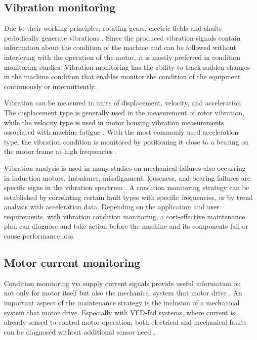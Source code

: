 \subsection{Vibration monitoring}

Due to their working principles, rotating gears, electric fields and shafts periodically generate vibrations \cite{randall2021vibration}. Since the produced vibration signals contain information about the condition of the machine and can be followed without interfering with the operation of the motor, it is mostly preferred in condition monitoring studies. Vibration monitoring has the ability to track sudden changes in the machine condition that enables monitor the condition of the equipment continuously or intermittently.

Vibration can be measured in units of displacement, velocity, and acceleration. The displacement type is generally used in the measurement of rotor vibration, while the velocity type is used in motor housing vibration measurements associated with machine fatigue \cite{mistry2016rotating}. With the most commonly used acceleration type, the vibration condition is monitored by positioning it close to a bearing on the motor frame at high frequencies \cite{mistry2016rotating,iso}.

Vibration analysis is used in many studies on mechanical failures also occurring in induction motors. Imbalance, misalignment, looseness, and bearing failures are specific signs in the vibration spectrum \cite{thorsen1998methods}. A condition monitoring strategy can be established by correlating certain fault types with specific frequencies, or by trend analysis with acceleration data. Depending on the application and user requirements, with vibration condition monitoring, a cost-effective maintenance plan can diagnose and take action before the machine and its components fail or cause performance loss.

\subsection{Motor current monitoring}

Condition monitoring via supply current signals provide useful information on not only for motor itself but also the mechanical system that motor drive \cite{thomson2001current}. An important aspect of the maintenance strategy is the inclusion of a mechanical system that motor drive. Especially with VFD-fed systems, where current is already sensed to control motor operation, both electrical and mechanical faults can be diagnosed without additional sensor need \cite{thomson2001current,gritli2017condition,corne2017misalignment,en201320958}. 

